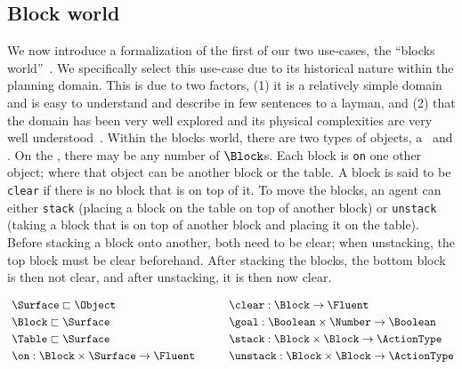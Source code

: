 \subsection{Block world}

We now introduce a formalization of the first of our two use-cases, the
``blocks world''~\cite{nilsson_principles_1982}. We specifically select
this use-case due to its historical nature within the planning domain.
This is due to two factors, (1) it is a relatively simple domain and is
easy to understand and describe in few sentences to a layman, and
(2) that the domain has been very well explored and its physical
complexities are very well
understood~\cite{gupta_complexity_1992,slaney_blocks_2001}. Within the
blocks world, there are two types of objects, a \Table\ and \Block.
On the \Table, there may be any number of $\Block$s.  Each block is
\texttt{on} one other object; where that object can be another block or the
table. A block is said to be \texttt{clear} if there is no block that
is on top of it. To move the blocks, an agent can either
\texttt{stack} (placing a block on the table on top of another block)
or \texttt{unstack} (taking a block that is on top of another block
and placing it on the table). Before stacking a block onto another, both need
to be clear; when unstacking, the top block must be clear beforehand.
After stacking the blocks, the bottom block is then not clear, and
after unstacking, it is then now clear.

\vspace{-0.03in}
  \begin{equation*}
    \begin{aligned}\
      &\Surface \sqsubset \Object \\
      &\Block \sqsubset \Surface \\
      &\Table \sqsubset \Surface \\
      &\on: \Block \times \Surface \rightarrow \Fluent
             \end{aligned} \hspace{30pt}
 \begin{aligned}
      &\clear: \Block \rightarrow \Fluent \\
      &\goal: \Boolean \times \Number \rightarrow \Boolean \\
      &\stack: \Block \times \Block \rightarrow \ActionType \\
      &\unstack: \Block \times \Block \rightarrow \ActionType
    \end{aligned}
  \end{equation*}
